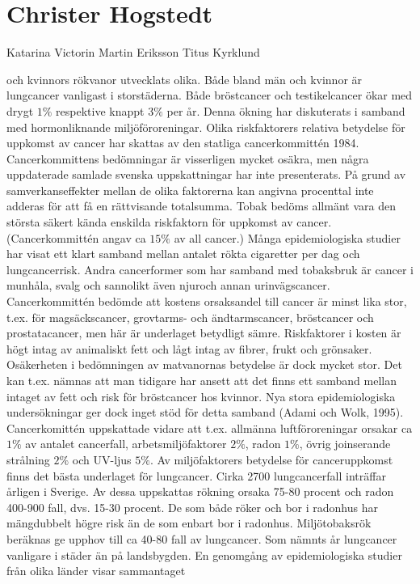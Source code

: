 \section*{Christer Hogstedt}
Katarina Victorin
Martin Eriksson
Titus Kyrklund

och kvinnors rökvanor utvecklats olika. Både bland män och kvinnor är lungcancer vanligast i storstäderna.
Både bröstcancer och testikelcancer ökar med drygt \(1 \%\) respektive knappt \(3 \%\) per år. Denna ökning har diskuterats i samband med hormonliknande miljöföroreningar.
Olika riskfaktorers relativa betydelse för uppkomst av cancer har skattas av den statliga cancerkommittén 1984. Cancerkommittens bedömningar är visserligen mycket osäkra, men några uppdaterade samlade svenska uppskattningar har inte presenterats. På grund av samverkanseffekter mellan de olika faktorerna kan angivna procenttal inte adderas för att få en rättvisande totalsumma.
Tobak bedöms allmänt vara den största säkert kända enskilda riskfaktorn för uppkomst av cancer. (Cancerkommittén angav ca \(15 \%\) av all cancer.) Många epidemiologiska studier har visat ett klart samband mellan antalet rökta cigaretter per dag och lungcancerrisk. Andra cancerformer som har samband med tobaksbruk är cancer i munhåla, svalg och sannolikt även njuroch annan urinvägscancer. Cancerkommittén bedömde att kostens orsaksandel till cancer är minst lika stor, t.ex. för magsäckscancer, grovtarms- och ändtarmscancer, bröstcancer och prostatacancer, men här är underlaget betydligt sämre. Riskfaktorer i kosten är högt intag av animaliskt fett och lågt intag av fibrer, frukt och grönsaker. Osäkerheten i bedömningen av matvanornas betydelse är dock mycket stor. Det kan t.ex. nämnas att man tidigare har ansett att det finns ett samband mellan intaget av fett och risk för bröstcancer hos kvinnor. Nya stora epidemiologiska undersökningar ger dock inget stöd för detta samband (Adami och Wolk, 1995).
Cancerkomittén uppskattade vidare att t.ex. allmänna luftföroreningar orsakar ca \(1 \%\) av antalet cancerfall, arbetsmiljöfaktorer \(2 \%\), radon \(1 \%\), övrig joinserande strålning \(2 \%\) och UV-ljus \(5 \%\).
Av miljöfaktorers betydelse för canceruppkomst finns det bästa underlaget för lungcancer. Cirka 2700 lungcancerfall inträffar årligen i Sverige. Av dessa uppskattas rökning orsaka 75-80 procent och radon 400-900 fall, dvs. 15-30 procent. De som både röker och bor i radonhus har mängdubbelt högre risk än de som enbart bor i radonhus. Miljötobaksrök beräknas ge upphov till ca 40-80 fall av lungcancer. Som nämnts år lungcancer vanligare i städer än på landsbygden. En genomgång av epidemiologiska studier från olika länder visar sammantaget

